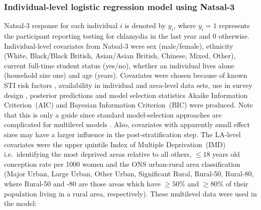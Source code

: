 \documentclass[fleqn,10pt]{wlscirep}
\begin{document}
\subsubsection*{Individual-level logistic regression model using Natsal-3}
Natsal-3 response for each individual $i$ is denoted by $y_i$, where $y_i = 1$ represents the participant reporting testing for chlamydia in the last year and 0 otherwise. 
Individual-level covariates from Natsal-3 were sex (male/female), ethnicity (White, Black/Black British, Asian/Asian British, Chinese, Mixed, Other), current full-time student status (yes/no), whether an individual lives alone (household size one) and age (years). Covariates were chosen because of known STI risk factors \cite{Waroux2014}, availability in individual and area-level data sets, use in survey design \cite{Erens2014b}, posterior predictions and model selection statistics Akaike Information Criterion~(AIC) and Bayesian Information Criterion~(BIC) \cite{Gelman2007} were produced. Note that this is only a guide since standard model-selection approaches are complicated for multilevel models \cite{Molenberghs2016}. Also, covariates with apparently small effect sizes may have a larger influence in the post-stratification step.
The LA-level covariates were the upper quintile Index of Multiple Deprivation~(IMD) i.e.\ identifying the most deprived areas relative to all others, $\leq 18$ years old conception rate per 1000 women and the ONS urban-rural area classification (Major Urban, Large Urban, Other Urban, Significant Rural, Rural-50, Rural-80, where Rural-50 and -80 are those areas which have $\geq 50$\% and $\geq 80$\% of their population living in a rural area, respectively). 
These multilevel data were used in the model:
\end{document}
